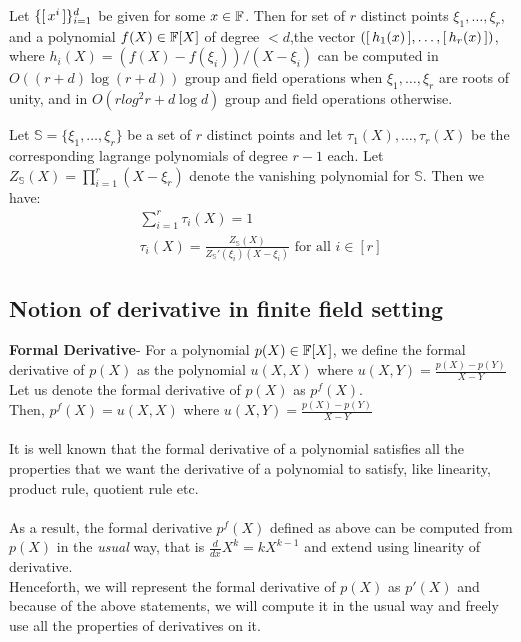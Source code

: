 \begin{fact}\label{fc:multkzg}
Let $\{[\,{x^i}\,]\}_{i=1}^d$ be given for some $x\in \mathbb{F}$. Then for set of $r$ distinct points $\xi_1,\ldots,\xi_r$,
and a polynomial $f(X)\in \mathbb{F}[X]$ of degree $<d$,the vector $([\,{h_1(x)}\,],\ldots,[\,{h_r(x)}\,])$,
where $h_i(X) = (f(X) - f(\xi_i))/(X - \xi_i)$ can be computed in
$O((r+d)\log(r+d))$ group and field operations when $\xi_1,\ldots,\xi_r$ are roots of unity, and in
$O(rlog^2 r + d\log d)$ group and field operations otherwise.
\end{fact}

\begin{fact}\label{fc:lagrange}
Let $\mathbb{S}=\{\xi_1,\ldots,\xi_r\}$ be a set of $r$ distinct points and let $\tau_1(X),\ldots,\tau_r(X)$ be
the corresponding lagrange polynomials of degree $r-1$ each. Let $Z_{\mathbb{S}}(X)=\prod_{i=1}^r (X-\xi_r)$ denote the vanishing polynomial
for $\mathbb{S}$. Then we have:
\begin{gather*}
    \sum_{i=1}^r \tau_i(X) = 1 \\
    \tau_i(X) = \frac{Z_{\mathbb{S}}(X)}{Z_{\mathbb{S}}'(\xi_i)(X-\xi_i)} \text{ for all } i\in [r]
\end{gather*}
\end{fact}

\subsection{Notion of derivative in finite field setting}

\textbf{Formal Derivative}- For a polynomial $p(X) \in \mathbb{F}[X]$, we define the formal derivative of $p(X)$ as the polynomial $u(X,X)$ where $u(X,Y)=\frac{p(X)-p(Y)}{X-Y}$\\
Let us denote the formal derivative of $p(X)$ as $p^f(X)$.\\
Then, $p^f(X)= u(X,X)$ where $u(X,Y)=\frac{p(X)-p(Y)}{X-Y}$\\\\
It is well known that the formal derivative of a polynomial satisfies all the properties that we want the derivative of a polynomial to satisfy, like linearity, product rule, quotient rule etc.\\\\
As a result, the formal derivative $p^f(X)$ defined as above can be computed from $p(X)$ in the \textit{usual} way, that is $\frac{d}{dx}X^k=k X^{k-1}$ and extend using linearity of derivative.\\
Henceforth, we will represent the formal derivative of $p(X)$ as $p'(X)$ and because of the above statements, we will compute it in the usual way and freely use all the properties of derivatives on it.\\

